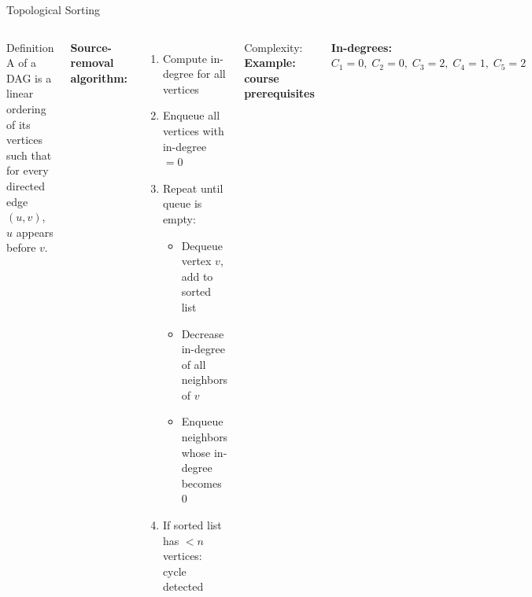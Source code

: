 \documentclass[aspectratio=169]{beamer}
\begin{document}
\begin{frame}[shrink=12]{Topological Sorting}
  \begin{columns}[T]
      \begin{block}{Definition}
        A  of a DAG is a linear ordering of
        its vertices such that for every directed edge $(u,v)$,
        $u$ appears before $v$.
      \end{block}
      \vspace{0.3em}
      \textbf{Source-removal algorithm:}
      \begin{enumerate}
        \item Compute in-degree for all vertices
        \item Enqueue all vertices with in-degree $= 0$
        \item Repeat until queue is empty:
          \begin{itemize}
            \item Dequeue vertex $v$, add to sorted list
            \item Decrease in-degree of all neighbors of $v$
            \item Enqueue neighbors whose in-degree becomes 0
          \end{itemize}
        \item If sorted list has $< n$ vertices: \alert{cycle detected}
      \end{enumerate}
      Complexity: 
      \textbf{Example: course prerequisites}
      \vspace{0.3em}
      \vspace{0.3em}
      \textbf{In-degrees:}
      $C_1{=}0,\;C_2{=}0,\;C_3{=}2,\;C_4{=}1,\;C_5{=}2$
  \end{columns}
\end{frame}
\end{document}
